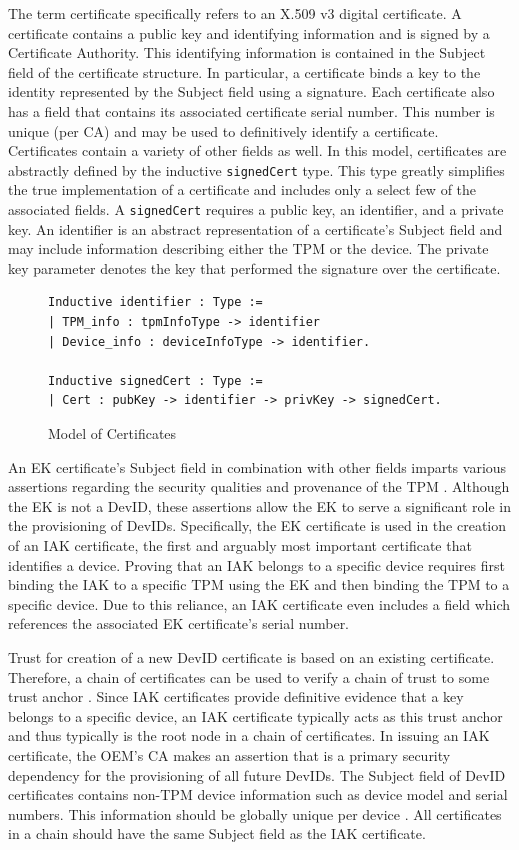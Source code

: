 \documentclass[runningheads]{llncs}
\begin{document}
The term certificate specifically refers to an X.509 v3 digital certificate. 
A certificate contains a public key and identifying information and is signed by a Certificate Authority. This identifying information is contained in the Subject field of the certificate structure. 
In particular, a certificate binds a key to the identity represented by the Subject field using a signature.
Each certificate also has a field that contains its associated certificate serial number. This number is unique (per CA) and may be used to definitively identify a certificate. 
Certificates contain a variety of other fields as well.
In this model, certificates are abstractly defined by the inductive \verb|signedCert| type. This type greatly simplifies the true implementation of a certificate and includes only a select few of the associated fields. A \verb|signedCert| requires a public key, an identifier, and a private key. An identifier is an abstract representation of a certificate's Subject field and may include information describing either the TPM or the device. The private key parameter denotes the key that performed the signature over the certificate.
\begin{figure}[h]
\begin{lstlisting}[language=Coq]
Inductive identifier : Type :=
| TPM_info : tpmInfoType -> identifier
| Device_info : deviceInfoType -> identifier.

Inductive signedCert : Type :=
| Cert : pubKey -> identifier -> privKey -> signedCert.
\end{lstlisting}
\caption{Model of Certificates}
\end{figure}

An EK certificate's Subject field in combination with other fields imparts various assertions regarding the security qualities and provenance of the TPM \cite{EKSpec}. 
Although the EK is not a DevID, these assertions allow the EK to serve a significant role in the provisioning of DevIDs.
Specifically, the EK certificate is used in the creation of an IAK certificate, the first and arguably most important certificate that identifies a device.
Proving that an IAK belongs to a specific device requires first binding the IAK to a specific TPM using the EK and then binding the TPM to a specific device. Due to this reliance, an IAK certificate even includes a field which references the associated EK certificate's serial number.

Trust for creation of a new DevID certificate is based on an existing certificate. Therefore, a chain of certificates can be used to verify a chain of trust to some trust anchor \cite{DevIDSpec-TCG}. Since IAK certificates provide definitive evidence that a key belongs to a specific device, an IAK certificate typically acts as this trust anchor and thus typically is the root node in a chain of certificates. In issuing an IAK certificate, the OEM's CA makes an assertion that is a primary security dependency for the provisioning of all future DevIDs. 
The Subject field of DevID certificates contains non-TPM device information such as device model and serial numbers. This information should be globally unique per device \cite{DevIDSpec-IEEE}. All certificates in a chain should have the same Subject field as the IAK certificate.
\end{document}

